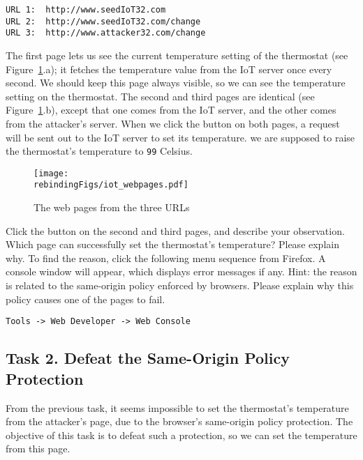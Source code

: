 \begin{lstlisting}
URL 1:  http://www.seedIoT32.com
URL 2:  http://www.seedIoT32.com/change
URL 3:  http://www.attacker32.com/change
\end{lstlisting}

 
The first page lets us see the current temperature setting of the thermostat (see
Figure~\ref{rebinding:fig:webpages}.a); it fetches
the temperature value from the IoT server once every second. We should keep this page always
visible, so we can see the temperature setting on the thermostat. 
The second and third pages
are identical (see Figure~\ref{rebinding:fig:webpages}.b), 
except that one comes from the IoT server, and the other comes from
the attacker's server. When we click the button on both pages, 
a request will be sent out to the IoT server to set its temperature. 
we are supposed to raise the thermostat's temperature 
to \texttt{99} Celsius.  


\begin{figure}[htb]
\begin{center}
\texttt{[image: \\rebindingFigs/iot\_webpages.pdf]}
\end{center}
\caption{The web pages from the three URLs}
\label{rebinding:fig:webpages}
\end{figure}
 

Click the button on the second and third pages, and describe your observation. Which page
can successfully set the thermostat's temperature? Please explain why. 
To find the reason, click the following menu sequence from Firefox. A console window will appear,
which displays error messages if any. Hint: the reason is related to the same-origin policy 
enforced by browsers. Please explain why this policy causes one of the pages to fail.
 
\begin{lstlisting}
Tools -> Web Developer -> Web Console
\end{lstlisting}
  


\subsection{Task 2. Defeat the Same-Origin Policy Protection}


From the previous task, it seems impossible to
set the thermostat's temperature from the attacker's
page, due to the browser's   
same-origin policy protection.  The objective of this task
is to defeat such a protection, so we can set the 
temperature from this page. 


